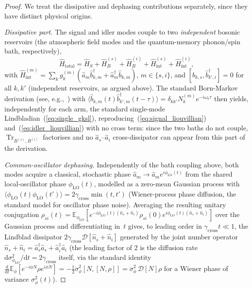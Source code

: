 \documentclass[journal]{IEEEtran}
\DeclareMathOperator{\Tr}{Tr}
\begin{document}
\begin{proof}
We treat the dissipative and dephasing contributions separately, since they have distinct physical origins.

\emph{Dissipative part.} The signal and idler modes couple to two \emph{independent} bosonic reservoirs (the atmospheric field modes and the quantum-memory phonon/spin bath, respectively),
\begin{equation}
\hat{H}_{\text{total}} = \hat{H}_S + \hat{H}_B^{(s)} + \hat{H}_B^{(i)} + \hat{H}_{\text{int}}^{(s)} + \hat{H}_{\text{int}}^{(i)},
\end{equation}
with $\hat{H}_{\text{int}}^{(m)} = \sum_k g_k^{(m)}(\hat{a}_m \hat{b}_{k,m}^\dagger + \hat{a}_m^\dagger \hat{b}_{k,m})$, $m\in\{s,i\}$, and $[\hat{b}_{k,s},\hat{b}_{k',i}^\dagger]=0$ for all $k,k'$ (independent reservoirs, as argued above). The standard Born-Markov derivation (see, e.g.,~\cite{breuer2002theory}) with $\langle \hat b_{k,m}(t)\hat b_{k',m}^\dagger(t-\tau)\rangle = \delta_{kk'}N_k^{(m)} e^{-i\omega_k\tau}$ then yields, independently for each arm, the standard single-mode Lindbladian~(\ref{eq:single_gksl}), reproducing~(\ref{eq:signal_liouvillian}) and~(\ref{eq:idler_liouvillian}) with no cross term: since the two baths do not couple, $\Tr_{B^{(s)},B^{(i)}}$ factorises and no $\hat a_s$--$\hat a_i$ cross-dissipator can appear from this part of the derivation.

\emph{Common-oscillator dephasing.} Independently of the bath coupling above, both modes acquire a classical, stochastic phase $\hat a_m \to \hat a_m e^{i\phi_{\text{LO}}(t)}$ from the shared local-oscillator phase $\phi_{\text{LO}}(t)$, modelled as a zero-mean Gaussian process with $\langle \phi_{\text{LO}}(t)\phi_{\text{LO}}(t')\rangle = 2\gamma_{\text{cross}}\min(t,t')$ (Wiener-process phase diffusion, the standard model for oscillator phase noise). Averaging the resulting unitary conjugation $\rho_{si}(t) = \mathbb{E}_{\phi_{\text{LO}}}\!\left[e^{-i\phi_{\text{LO}}(t)(\hat n_s+\hat n_i)}\rho_{si}(0)e^{i\phi_{\text{LO}}(t)(\hat n_s+\hat n_i)}\right]$ over the Gaussian process and differentiating in~$t$ gives, to leading order in $\gamma_{\text{cross}}t\ll 1$, the Lindblad dissipator $2\gamma_{\text{cross}}\mathcal D[\hat n_s+\hat n_i]$ generated by the joint number operator $\hat n_s+\hat n_i = \hat a_s^\dagger\hat a_s+\hat a_i^\dagger\hat a_i$ (the leading factor of $2$ is the diffusion rate $\mathrm d\sigma_{\phi_{\text{LO}}}^2/\mathrm dt=2\gamma_{\text{cross}}$ itself, via the standard identity $\tfrac{\mathrm d}{\mathrm dt}\mathbb E_{\phi}[e^{-i\phi N}\rho e^{i\phi N}] = -\tfrac12\dot\sigma_\phi^2[N,[N,\rho]] = \dot\sigma_\phi^2\,\mathcal D[N]\rho$ for a Wiener phase of variance $\sigma_\phi^2(t)$).


\end{proof}
\end{document}
